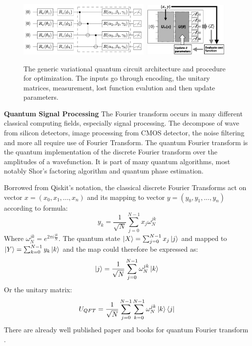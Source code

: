 \documentclass{article}
\begin{document}
\begin{figure}[h]
  \begin{center}
    \includegraphics[width=0.58\textwidth]{vqc.png} 
    \includegraphics[width=0.38\textwidth]{vqc1.png} 
  \end{center}
  \caption{The generic variational quantum circuit 
  architecture and procedure for optimization. The 
  inputs go through encoding, the unitary matrices, 
  measurement, lost function evalution and then 
  update parameters.}
\end{figure}

\textbf{Quantum Signal Processing}
The Fourier transform occurs in many different classical computing 
fields, especially signal processing. The decompose of wave from 
silicon detectors, image processing from CMOS detector, the noise filtering
and more all require use of Fourier Transform. The quantum Fourier 
transform is the quantum implementation of the discrete Fourier 
transform over the amplitudes of a wavefunction. It is part of 
many quantum algorithms, most notably Shor's factoring algorithm
and quantum phase estimation. 

Borrowed from Qiskit's notation, the classical discrete Fourier Transforms
act on vector $x = (x_0, x_1,...,x_n)$ and its mapping to vector $y = (y_0, y_1,...,y_n)$
according to formula:
\begin{equation}
  y_k = \frac{1}{\sqrt{N}} \sum^{N-1}_{j=0} x_j \omega_N^{jk}
\end{equation}
Where $\omega_N^{jk} = e^{2\pi i \frac{jk}{N}}$. The quantum state
$ \ket{X} = \sum^{N-1}_{j=0} x_j \ket{j} $ and mapped to $ \ket{Y} = \sum^{N-1}_{k=0} y_k \ket{k} $
and the map could therefore be expressed as:
\begin{equation}
  \ket{j}  = \frac{1}{\sqrt{N}} \sum^{N-1}_{j=0} \omega_N^{jk} \ket{k}
\end{equation}
Or the unitary matrix:
\begin{equation}
  U_{QFT}= \frac{1}{\sqrt{N}} \sum^{N-1}_{j=0} \sum^{N-1}_{k=0}  \omega_N^{jk} \ket{k} \bra{j}
\end{equation}
There are already well published paper and books for quantum Fourier transform \cite{qc_book}.
\end{document}
